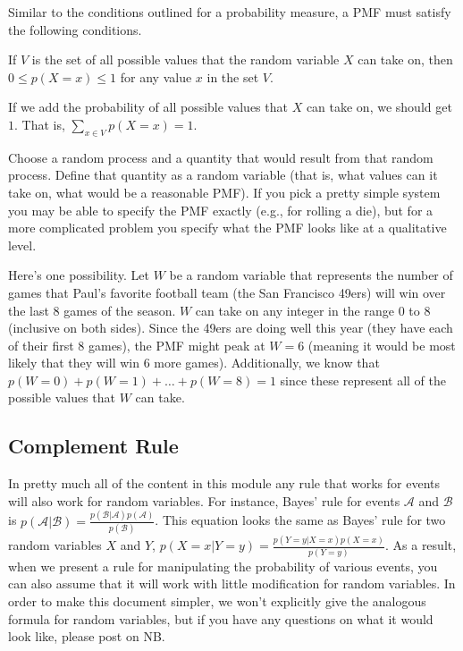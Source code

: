 \documentclass{tufte-handout}
\begin{document}
\noindent Similar to the conditions outlined for a probability measure, a PMF must satisfy the following conditions.
\be
\item If $V$ is the set of all possible values that the random variable $X$ can take on, then $0 \leq p(X = x) \leq 1$ for any value $x$ in the set $V$.
\item If we add the probability of all possible values that $X$ can take on, we should get $1$.  That is, $\sum_{x \in V} p(X = x) = 1$.
\ee

\ei

\begin{exercise}
Choose a random process and a quantity that would result from that random process.  Define that quantity as a random variable (that is, what values can it take on, what would be a reasonable PMF).  If you pick a pretty simple system you may be able to specify the PMF exactly (e.g., for rolling a die), but for a more complicated problem you specify what the PMF looks like at a qualitative level.
\begin{boxedsolution}
Here's one possibility.  Let $W$ be a random variable that represents the number of games that Paul's favorite football team (the San Francisco 49ers) will win over the last 8 games of the season.  $W$ can take on any integer in the range $0$ to $8$ (inclusive on both sides).  Since the 49ers are doing well this year (they have each of their first 8 games), the PMF might peak at $W=6$ (meaning it would be most likely that they will win 6 more games).   Additionally, we know that $p(W=0) + p(W=1) + \ldots + p(W=8) = 1$ since these represent all of the possible values that $W$ can take.
\end{boxedsolution}
\end{exercise}


\subsection{Complement Rule}

\begin{notice}
In pretty much all of the content in this module any rule that works for events will also work for random variables.  For instance, Bayes' rule for events $\mathcal{A}$ and $\mathcal{B}$ is $p(\mathcal{A} | \mathcal{B}) = \frac{p(\mathcal{B}|\mathcal{A}) p(\mathcal{A})}{p(\mathcal{B})}$.  This equation looks the same as Bayes' rule for two random variables $X$ and $Y$, $p(X=x | Y=y) = \frac{p(Y=y|X=x) p(X=x)}{p(Y=y)}$.  As a result, when we present a rule for manipulating the probability of various events, you can also assume that it will work with little modification for random variables.  In order to make this document simpler, we won't explicitly give the analogous formula for random variables, but if you have any questions on what it would look like, please post on NB.
\end{notice}
\end{document}
